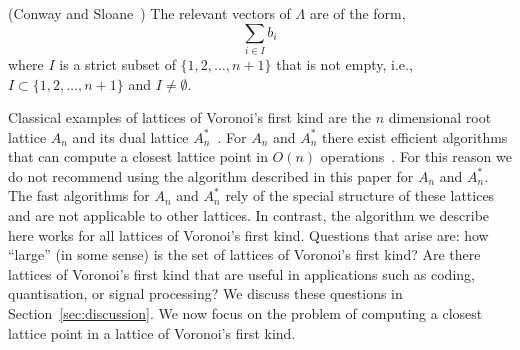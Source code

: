 \documentclass[final,leqno]{siamltex}
\begin{document}
\begin{theorem} \label{thm:revvecssuperbase} (Conway and Sloane~\cite[Theorem~3]{ConwaySloane1992_voronoi_lattice_3d_obtuse_superbases})
The relevant vectors of $\Lambda$ are of the form,
\[
\sum_{i \in I} b_i
\]
where $I$ is a strict subset of $\{1, 2, \dots, n+1\}$ that is not empty, i.e., $I \subset \{1, 2, \dots, n+1\}$ and $I \neq \emptyset$.
\end{theorem}  
 



Classical examples of lattices of Voronoi's first kind are the $n$ dimensional root lattice $A_n$ and its dual lattice $A_n^*$~\cite{SPLAG}.  %
For $A_n$ and $A_n^*$ there exist efficient algorithms that can compute a closest lattice point in $O(n)$ operations~\cite{McKilliam2009CoxeterLattices,Conway1982FastQuantDec}. For this reason we do not recommend using the algorithm described in this paper for $A_n$ and $A_n^*$.  
The fast algorithms for $A_n$ and $A_n^*$ rely of the special structure of these lattices and are not applicable to other lattices.  In contrast, the algorithm we describe here works for all lattices of Voronoi's first kind.  Questions that arise are: how ``large'' (in some sense) is the set of lattices of Voronoi's first kind?  Are there lattices of Voronoi's first kind that are useful in applications such as coding, quantisation, or signal processing?  We discuss these questions in Section~\ref{sec:discussion}.  We now focus on the problem of computing a closest lattice point in a lattice of Voronoi's first kind. 
\end{document}
